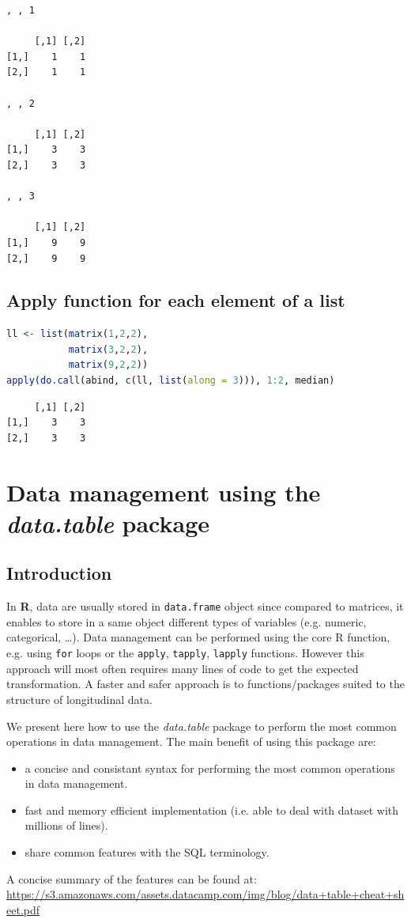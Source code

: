 \documentclass{article}
\newcommand\Rlogo{\textbf{\textsf{R}}\xspace}
\begin{document}
\label{}
\begin{verbatim}
, , 1

     [,1] [,2]
[1,]    1    1
[2,]    1    1

, , 2

     [,1] [,2]
[1,]    3    3
[2,]    3    3

, , 3

     [,1] [,2]
[1,]    9    9
[2,]    9    9
\end{verbatim}
\subsection{Apply function for each element of a list}
\label{sec:org84d19d6}


\begin{lstlisting}[language=r,numbers=none]
ll <- list(matrix(1,2,2),
           matrix(3,2,2),
           matrix(9,2,2))
apply(do.call(abind, c(ll, list(along = 3))), 1:2, median)
\end{lstlisting}

\label{}
\begin{verbatim}
     [,1] [,2]
[1,]    3    3
[2,]    3    3
\end{verbatim}
\section{Data management using the \emph{data.table} package}
\label{sec:orgdf535db}
\subsection{Introduction}
\label{sec:org982abfc}
In \Rlogo, data are usually stored in \texttt{data.frame} object since compared
to matrices, it enables to store in a same object different types of
variables (e.g. numeric, categorical, \ldots{}). Data management can be
performed using the core R function, e.g. using \texttt{for} loops or
the \texttt{apply}, \texttt{tapply}, \texttt{lapply} functions.  However this approach will
most often requires many lines of code to get the expected
transformation.  A faster and safer approach is to functions/packages
suited to the structure of longitudinal data.

\bigskip

We present here how to use the \emph{data.table} package to perform the
most common operations in data management. The main benefit of using
this package are:
\begin{itemize}
\item a concise and consistant syntax for performing the most common
operations in data management.
\item fast and memory efficient implementation (i.e. able to deal with
dataset with millions of lines).
\item share common features with the SQL terminology.
\end{itemize}
A concise summary of the features can be found at:
\url{https://s3.amazonaws.com/assets.datacamp.com/img/blog/data+table+cheat+sheet.pdf}
\end{document}
